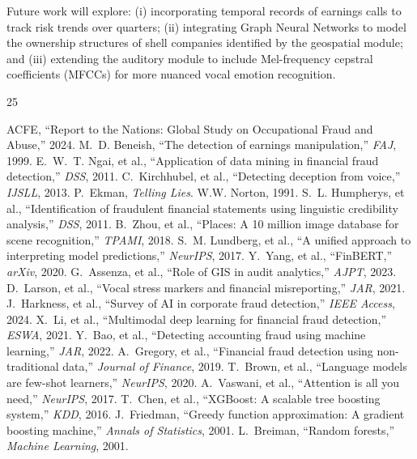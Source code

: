 \documentclass[conference]{IEEEtran}
\begin{document}
Future work will explore: (i) incorporating temporal records of earnings calls to track risk trends over quarters; (ii) integrating Graph Neural Networks to model the ownership structures of shell companies identified by the geospatial module; and (iii) extending the auditory module to include Mel-frequency cepstral coefficients (MFCCs) for more nuanced vocal emotion recognition.



\begin{thebibliography}{25}

ACFE, ``Report to the Nations: Global Study on Occupational Fraud and Abuse,'' 2024.
M.~D. Beneish, ``The detection of earnings manipulation,'' \emph{FAJ}, 1999.
E.~W.~T. Ngai, et al., ``Application of data mining in financial fraud detection,'' \emph{DSS}, 2011.
C.~Kirchhubel, et al., ``Detecting deception from voice,'' \emph{IJSLL}, 2013.
P.~Ekman, \emph{Telling Lies}. W.W. Norton, 1991.
S.~L. Humpherys, et al., ``Identification of fraudulent financial statements using linguistic credibility analysis,'' \emph{DSS}, 2011.
B.~Zhou, et al., ``Places: A 10 million image database for scene recognition,'' \emph{TPAMI}, 2018.
S.~M. Lundberg, et al., ``A unified approach to interpreting model predictions,'' \emph{NeurIPS}, 2017.
Y.~Yang, et al., ``FinBERT,'' \emph{arXiv}, 2020.
G.~Assenza, et al., ``Role of GIS in audit analytics,'' \emph{AJPT}, 2023.
D.~Larson, et al., ``Vocal stress markers and financial misreporting,'' \emph{JAR}, 2021.
J.~Harkness, et al., ``Survey of AI in corporate fraud detection,'' \emph{IEEE Access}, 2024.
X.~Li, et al., ``Multimodal deep learning for financial fraud detection,'' \emph{ESWA}, 2021.
Y.~Bao, et al., ``Detecting accounting fraud using machine learning,'' \emph{JAR}, 2022.
A.~Gregory, et al., ``Financial fraud detection using non-traditional data,'' \emph{Journal of Finance}, 2019.
T.~Brown, et al., ``Language models are few-shot learners,'' \emph{NeurIPS}, 2020.
A.~Vaswani, et al., ``Attention is all you need,'' \emph{NeurIPS}, 2017.
T.~Chen, et al., ``XGBoost: A scalable tree boosting system,'' \emph{KDD}, 2016.
J.~Friedman, ``Greedy function approximation: A gradient boosting machine,'' \emph{Annals of Statistics}, 2001.
L.~Breiman, ``Random forests,'' \emph{Machine Learning}, 2001.

\end{thebibliography}
\end{document}
